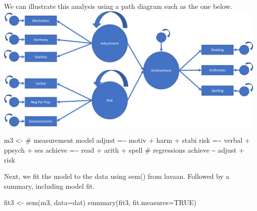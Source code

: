 \documentclass[
]{article}
\newenvironment{Shaded}{\begin{snugshade}}{\end{snugshade}}
\newcommand{\AttributeTok}[1]{\textcolor[rgb]{0.77,0.63,0.00}{#1}}
\newcommand{\ConstantTok}[1]{\textcolor[rgb]{0.00,0.00,0.00}{#1}}
\newcommand{\FunctionTok}[1]{\textcolor[rgb]{0.00,0.00,0.00}{#1}}
\newcommand{\NormalTok}[1]{#1}
\newcommand{\OtherTok}[1]{\textcolor[rgb]{0.56,0.35,0.01}{#1}}
\newcommand{\StringTok}[1]{\textcolor[rgb]{0.31,0.60,0.02}{#1}}
\begin{document}
We can illustrate this analysis using a path diagram such as the one
below. \includegraphics{StrRegLabl.PNG}

\begin{Shaded}
\begin{Highlighting}[]
\NormalTok{m3 }\OtherTok{\textless{}{-}} \StringTok{\textquotesingle{}}
\StringTok{\# measurement model}
\StringTok{adjust =\textasciitilde{} motiv + harm + stabi}
\StringTok{risk =\textasciitilde{} verbal + ppsych + ses}
\StringTok{achieve =\textasciitilde{} read + arith + spell}
\StringTok{\# regressions}
\StringTok{achieve \textasciitilde{} adjust + risk}
\StringTok{\textquotesingle{}}
\end{Highlighting}
\end{Shaded}

Next, we fit the model to the data using sem() from lavaan. Followed by
a summary, including model fit.

\begin{Shaded}
\begin{Highlighting}[]
\NormalTok{fit3 }\OtherTok{\textless{}{-}} \FunctionTok{sem}\NormalTok{(m3, }\AttributeTok{data=}\NormalTok{dat)}
\FunctionTok{summary}\NormalTok{(fit3, }\AttributeTok{fit.measures=}\ConstantTok{TRUE}\NormalTok{)}
\end{Highlighting}
\end{Shaded}
\end{document}
